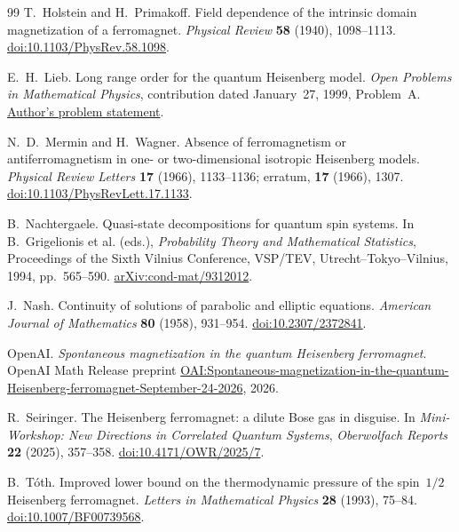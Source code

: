 \begin{thebibliography}{99}
T.~Holstein and H.~Primakoff.
Field dependence of the intrinsic domain magnetization of a ferromagnet.
\emph{Physical Review} \textbf{58} (1940), 1098--1113.
\href{https://doi.org/10.1103/PhysRev.58.1098}{doi:10.1103/PhysRev.58.1098}.

E.~H.~Lieb.
Long range order for the quantum Heisenberg model.
\emph{Open Problems in Mathematical Physics}, contribution dated
January~27, 1999, Problem~A.
\href{https://web.math.princeton.edu/~aizenman/OpenProblems_MathPhys/9901.HeisenbergFerr.html}{Author's problem statement}.

N.~D.~Mermin and H.~Wagner.
Absence of ferromagnetism or antiferromagnetism in one- or two-dimensional
isotropic Heisenberg models.
\emph{Physical Review Letters} \textbf{17} (1966), 1133--1136;
erratum, \textbf{17} (1966), 1307.
\href{https://doi.org/10.1103/PhysRevLett.17.1133}{doi:10.1103/PhysRevLett.17.1133}.

B.~Nachtergaele.
Quasi-state decompositions for quantum spin systems.
In B.~Grigelionis et al. (eds.),
\emph{Probability Theory and Mathematical Statistics},
Proceedings of the Sixth Vilnius Conference,
VSP/TEV, Utrecht--Tokyo--Vilnius, 1994, pp.~565--590.
\href{https://arxiv.org/abs/cond-mat/9312012}{arXiv:cond-mat/9312012}.

J.~Nash.
Continuity of solutions of parabolic and elliptic equations.
\emph{American Journal of Mathematics} \textbf{80} (1958), 931--954.
\href{https://doi.org/10.2307/2372841}{doi:10.2307/2372841}.

OpenAI.
\emph{Spontaneous magnetization in the quantum Heisenberg ferromagnet}.
OpenAI Math Release preprint
\href{https://github.com/openai/math/blob/main/preprints/Spontaneous-magnetization-in-the-quantum-Heisenberg-ferromagnet-September-24-2026/paper.pdf}{OAI:Spontaneous-magnetization-in-the-quantum-Heisenberg-ferromagnet-September-24-2026},
2026.

R.~Seiringer.
The Heisenberg ferromagnet: a dilute Bose gas in disguise.
In \emph{Mini-Workshop: New Directions in Correlated Quantum Systems},
\emph{Oberwolfach Reports} \textbf{22} (2025), 357--358.
\href{https://doi.org/10.4171/OWR/2025/7}{doi:10.4171/OWR/2025/7}.

B.~T\'oth.
Improved lower bound on the thermodynamic pressure of the spin~\(1/2\)
Heisenberg ferromagnet.
\emph{Letters in Mathematical Physics} \textbf{28} (1993), 75--84.
\href{https://doi.org/10.1007/BF00739568}{doi:10.1007/BF00739568}.

\end{thebibliography}
